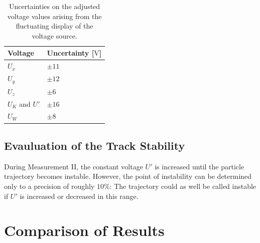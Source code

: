\documentclass[
	paper=A4,
	parskip=full,
	chapterprefix=true,
	11pt,
	headings=normal,
	bibliography=totoc,
	listof=totoc,
	titlepage=on,
]{scrreprt}
\begin{document}
\begin{table}[htbp]
	\centering
	\begin{tabular}{ 
			l
			l
		}
		\toprule
		Voltage & Uncertainty [$\si{\volt}$] \\ 
		\midrule
		$U_x$ & $\pm 11$  \\
		$U_y$ & $\pm 12$ \\
		$U_z$ & $\pm  6$ \\
		$U_K$ and $U'$ & $\pm 16$ \\
		$U_W$ & $\pm 8$ \\
		
		\bottomrule
	\end{tabular}
	\caption{Uncertainties on the adjusted voltage values arising from the fluctuating display of the voltage source.}
	\label{tbl:unc_fluctuation}
\end{table}

\section{Evauluation of the Track Stability}
During Measurement II, the constant voltage $U'$ is increased until the particle trajectory becomes instable. However, the point of instability can be determined only to a precision of roughly $10\%$: The trajectory could as well be called instable if $U'$ is increased or decreased in this range. 
 


\chapter{Comparison of Results}


\cleardoublepage


{}
\end{document}
